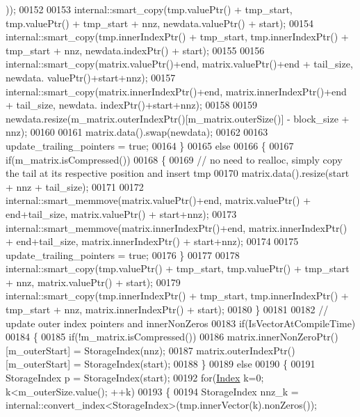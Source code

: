 \begin{DoxyCode}
      ));
00152 
00153         internal::smart\_copy(tmp.valuePtr() + tmp\_start,      tmp.valuePtr() + tmp\_start + nnz,       
      newdata.valuePtr() + start);
00154         internal::smart\_copy(tmp.innerIndexPtr() + tmp\_start, tmp.innerIndexPtr() + tmp\_start + nnz,  
      newdata.indexPtr() + start);
00155 
00156         internal::smart\_copy(matrix.valuePtr()+end,       matrix.valuePtr()+end + tail\_size,      newdata.
      valuePtr()+start+nnz);
00157         internal::smart\_copy(matrix.innerIndexPtr()+end,  matrix.innerIndexPtr()+end + tail\_size, newdata.
      indexPtr()+start+nnz);
00158 
00159         newdata.resize(m\_matrix.outerIndexPtr()[m\_matrix.outerSize()] - block\_size + nnz);
00160 
00161         matrix.data().swap(newdata);
00162 
00163         update\_trailing\_pointers = \textcolor{keyword}{true};
00164       \}
00165       \textcolor{keywordflow}{else}
00166       \{
00167         \textcolor{keywordflow}{if}(m\_matrix.isCompressed())
00168         \{
00169           \textcolor{comment}{// no need to realloc, simply copy the tail at its respective position and insert tmp}
00170           matrix.data().resize(start + nnz + tail\_size);
00171 
00172           internal::smart\_memmove(matrix.valuePtr()+end,      matrix.valuePtr() + end+tail\_size,      
      matrix.valuePtr() + start+nnz);
00173           internal::smart\_memmove(matrix.innerIndexPtr()+end, matrix.innerIndexPtr() + end+tail\_size, 
      matrix.innerIndexPtr() + start+nnz);
00174 
00175           update\_trailing\_pointers = \textcolor{keyword}{true};
00176         \}
00177 
00178         internal::smart\_copy(tmp.valuePtr() + tmp\_start,      tmp.valuePtr() + tmp\_start + nnz,       
      matrix.valuePtr() + start);
00179         internal::smart\_copy(tmp.innerIndexPtr() + tmp\_start, tmp.innerIndexPtr() + tmp\_start + nnz,  
      matrix.innerIndexPtr() + start);
00180       \}
00181 
00182       \textcolor{comment}{// update outer index pointers and innerNonZeros}
00183       \textcolor{keywordflow}{if}(IsVectorAtCompileTime)
00184       \{
00185         \textcolor{keywordflow}{if}(!m\_matrix.isCompressed())
00186           matrix.innerNonZeroPtr()[m\_outerStart] = StorageIndex(nnz);
00187         matrix.outerIndexPtr()[m\_outerStart] = StorageIndex(start);
00188       \}
00189       \textcolor{keywordflow}{else}
00190       \{
00191         StorageIndex p = StorageIndex(start);
00192         \textcolor{keywordflow}{for}(\hyperlink{namespace_eigen_a62e77e0933482dafde8fe197d9a2cfde}{Index} k=0; k<m\_outerSize.value(); ++k)
00193         \{
00194           StorageIndex nnz\_k = internal::convert\_index<StorageIndex>(tmp.innerVector(k).nonZeros());

\end{DoxyCode}
